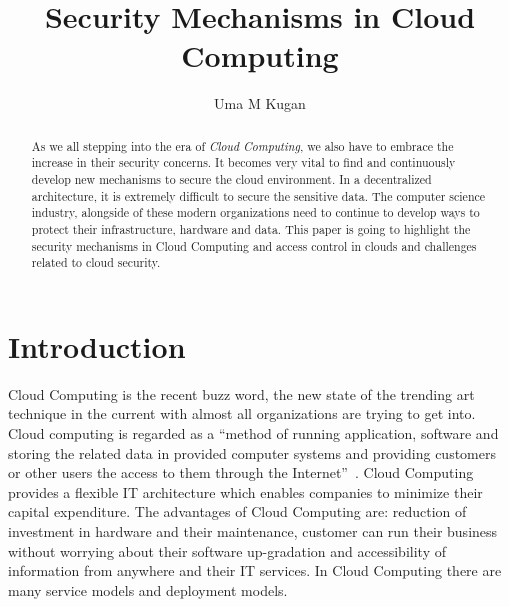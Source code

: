 
\title{Security Mechanisms in Cloud Computing}

\author{Uma M Kugan}
\renewcommand{\shortauthors}{Uma Kugan}

\begin{abstract}
As we all stepping into the era of \emph{Cloud Computing}, we also have to 
embrace the increase in their security concerns. It becomes very vital to find
and continuously develop new mechanisms to secure the cloud environment. In a 
decentralized architecture, it is extremely difficult to secure the sensitive
data. The computer science industry, alongside of these modern  organizations
need to continue to develop ways to protect their infrastructure, hardware 
and data. This paper is going to highlight the security mechanisms in Cloud 
Computing and access control in clouds and challenges related to cloud 
security.
\end{abstract}


\maketitle

\section{Introduction}
Cloud Computing is the recent buzz word, the new state of the trending 
art technique in the current with almost all organizations are trying
to get into. Cloud computing is regarded as a ``method of running application, 
software and storing the related data in provided computer systems and 
providing customers or other users the access to them through the 
Internet''~\cite{hid-sp18-513-cloud1}. Cloud Computing provides a flexible IT 
architecture which enables companies to minimize their capital expenditure. 
The advantages of Cloud Computing are: reduction of investment in hardware 
and their maintenance, customer can run their business without worrying 
about their software up-gradation and accessibility of information from 
anywhere and their IT services. In Cloud Computing there are many service 
models and deployment models. 

